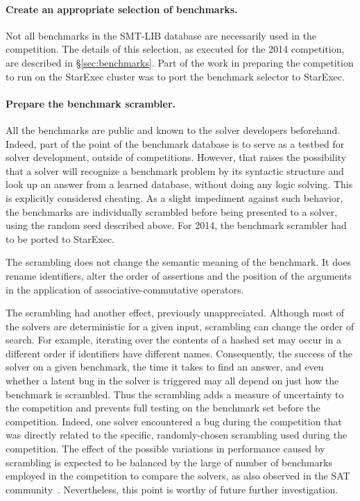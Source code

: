 \documentclass[twoside,11pt]{article}
\begin{document}
\paragraph{Create an appropriate selection of benchmarks.} Not all benchmarks in the SMT-LIB database are necessarily used in the competition. The details of this selection, as executed for the 2014 competition, are described in \S\ref{sec:benchmarks}. Part of the work in preparing the competition to run on the StarExec cluster was to port the benchmark selector to StarExec.

\paragraph{Prepare the benchmark scrambler.} All the benchmarks are public and known to the solver developers beforehand. Indeed, part of the point of the benchmark database is to serve as a testbed for solver development, outside of competitions. However, that raises the possibility that a solver will recognize a benchmark problem by its syntactic structure and look up an answer from a learned database, without doing any logic solving. This is explicitly considered cheating. As a slight impediment against such behavior, the benchmarks are individually scrambled before being presented to a solver, using the random seed described above. For 2014, the benchmark scrambler had to be ported to StarExec.

The scrambling does not change the semantic meaning of the benchmark. It does rename identifiers, alter the order of assertions and the position of the arguments in the application of associative-commutative operators.

The scrambling had another effect, previously unappreciated. Although most of the solvers are deterministic for a given input, scrambling can change the order of search. For example, iterating over the contents of a hashed set may occur in a different order if identifiers have different names. Consequently, the success of the solver on a given benchmark, the time it takes to find an answer, and even whether a latent bug in the solver is triggered may all depend on just how the benchmark is scrambled. Thus the scrambling adds a measure of uncertainty to the competition and prevents full testing on the benchmark set before the competition. Indeed, one solver encountered a bug during the competition that was directly related to the specific, randomly-chosen scrambling used during the competition. The effect of the possible variations in performance caused by scrambling is expected to be balanced by the large of number of benchmarks employed in the competition to compare the solvers, as also observed in the SAT community~\cite{leberre+03}. Nevertheless, this point is worthy of future further investigation.
\end{document}
